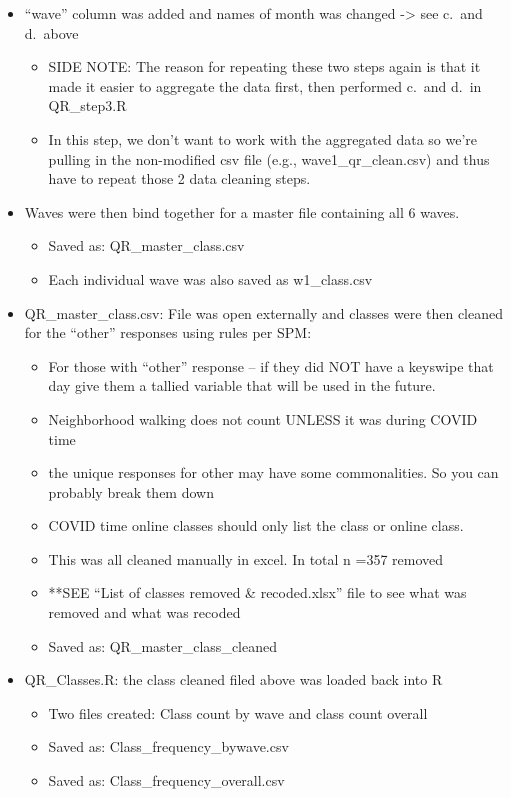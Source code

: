\documentclass[
]{book}
\providecommand{\tightlist}{%
  \setlength{\itemsep}{0pt}\setlength{\parskip}{0pt}}
\begin{document}
\begin{itemize}
\tightlist
\item
  ``wave'' column was added and names of month was changed -\textgreater{} see c.~and d.~above

  \begin{itemize}
  \tightlist
  \item
    SIDE NOTE: The reason for repeating these two steps again is that it made it easier to aggregate the data first, then performed c.~and d.~in QR\_step3.R
  \item
    In this step, we don't want to work with the aggregated data so we're pulling in the non-modified csv file (e.g., wave1\_qr\_clean.csv) and thus have to repeat those 2 data cleaning steps.
  \end{itemize}
\item
  Waves were then bind together for a master file containing all 6 waves.

  \begin{itemize}
  \tightlist
  \item
    Saved as: QR\_master\_class.csv
  \item
    Each individual wave was also saved as w1\_class.csv
  \end{itemize}
\item
  QR\_master\_class.csv: File was open externally and classes were then cleaned for the ``other'' responses using rules per SPM:

  \begin{itemize}
  \tightlist
  \item
    For those with ``other'' response -- if they did NOT have a keyswipe that day give them a tallied variable that will be used in the future.
  \item
    Neighborhood walking does not count UNLESS it was during COVID time
  \item
    the unique responses for other may have some commonalities. So you can probably break them down
  \item
    COVID time online classes should only list the class or online class.
  \item
    This was all cleaned manually in excel. In total n =357 removed
  \item
    **SEE ``List of classes removed \& recoded.xlsx'' file to see what was removed and what was recoded
  \item
    Saved as: QR\_master\_class\_cleaned
  \end{itemize}
\item
  QR\_Classes.R: the class cleaned filed above was loaded back into R

  \begin{itemize}
  \tightlist
  \item
    Two files created: Class count by wave and class count overall
  \item
    Saved as: Class\_frequency\_bywave.csv
  \item
    Saved as: Class\_frequency\_overall.csv
  \end{itemize}
\end{itemize}
\end{document}
